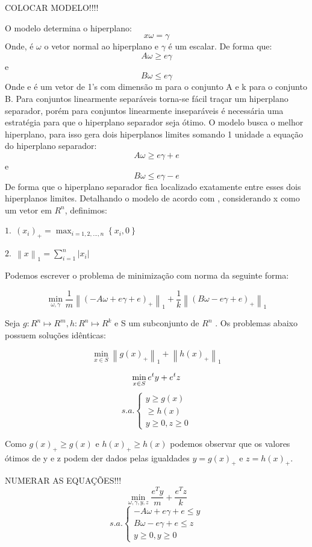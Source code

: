 COLOCAR MODELO!!!!

O modelo determina o hiperplano:
$$ x\omega = \gamma $$
Onde,  é $\omega$ o vetor normal ao hiperplano e $\gamma$ é um escalar. De forma que:
$$A\omega \geq e\gamma$$
e
$$B\omega \leq e\gamma$$
Onde e é um vetor de 1’s com dimensão m para o conjunto A e k para o conjunto B.
Para conjuntos linearmente separáveis torna-se fácil traçar um hiperplano separador, porém para conjuntos linearmente inseparáveis é necessária uma estratégia para que o hiperplano separador seja ótimo.
O modelo busca o melhor hiperplano, para isso gera dois hiperplanos limites somando 1 unidade a equação do hiperplano separador:
$$A\omega \geq e\gamma + e$$
e
$$B\omega \leq e\gamma - e$$
De forma que o hiperplano separador fica localizado exatamente entre esses dois hiperplanos limites.
Detalhando o modelo de acordo com , considerando x como um vetor em $ R^{n} $, definimos:

$1.\ \ (x_{i})_{+} = \max_{i=1,2,...,n}{\left \{x_{i},0  \right \}}$

$2.\ \ \left \| x \right \|_{1} = \sum_{i=1}^{n}\left | x_{i} \right |$

Podemos escrever o problema de minimização com norma da seguinte forma:

$$\min_{\omega ,\gamma }\frac{1}{m}\left \| \left ( -A\omega + e\gamma  + e \right )_{+} \right \|_{1} + \frac{1}{k}\left \| \left ( B\omega - e\gamma + e  \right )_{+} \right \|_{1}$$

Seja $g:R^{n} \mapsto R^{m} , h:R^{n} \mapsto R^{k}$ e S um subconjunto de $R^{n}$ . Os problemas abaixo possuem soluções idênticas:

$$\min_{x\in S}\left \| g(x)_{+} \right \|_{1} + \left \| h(x)_{+} \right \|_{1}$$


$$\min_{x\in S} e^{t}y + e^{t}z\\$$
$$ s.a.\left\{\begin{matrix}y\geq g(x)\\ \geq h(x)\\ y\geq 0, z\geq0\end{matrix}\right.$$

Como $g(x)_{+}\geq g(x)$ e $h(x)_{+}\geq h(x)$ podemos observar que os valores ótimos de y e z podem der dados pelas igualdades $y=g(x)_{+}$ e $z=h(x)_{+}$.

NUMERAR AS EQUAÇÕES!!!
$$\min_{\omega ,\gamma ,y,z}\frac{e^{T}y}{m}+\frac{e^{T}z}{k}$$
$$s.a.\left\{\begin{matrix}-A\omega +e\gamma+e\leq y\\B\omega -e\gamma+e\leq  z\\ y\geq 0,y\geq 0\end{matrix}\right.$$

